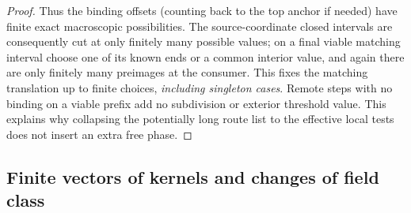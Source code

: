 \begin{proof}
Thus the binding offsets (counting back to the top anchor if needed) have finite exact
macroscopic possibilities. The source-coordinate closed intervals are consequently cut at only finitely many
possible values; on a final viable matching interval choose one of its known ends or a common interior
value, and again there are only finitely many preimages at the consumer. This fixes the matching translation
up to finite choices, \emph{including singleton cases}. Remote steps with no binding on a viable prefix add
no subdivision or exterior threshold value. This explains why collapsing the potentially long route list to
the effective local tests does not insert an extra free phase.

\end{proof}

\subsection{Finite vectors of kernels and changes of field class}

